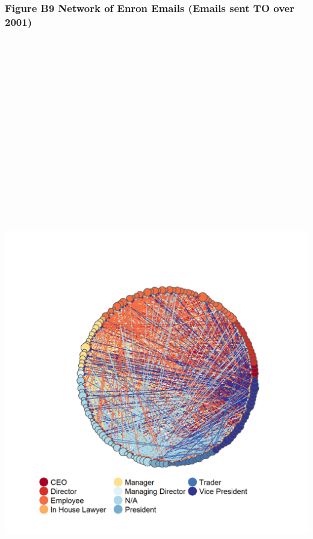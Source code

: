 \documentclass[]{article}
\begin{document}
\newpage

\subsubsection{Figure B9 Network of Enron Emails (Emails sent TO over
2001)}\label{figure-b9-network-of-enron-emails-emails-sent-to-over-2001}

\section{\texorpdfstring{\protect\includegraphics[height=12.50000in]{images/n_to_01e.png}}{Network of Enron Emails}}\label{network-of-enron-emails-6}
\end{document}
